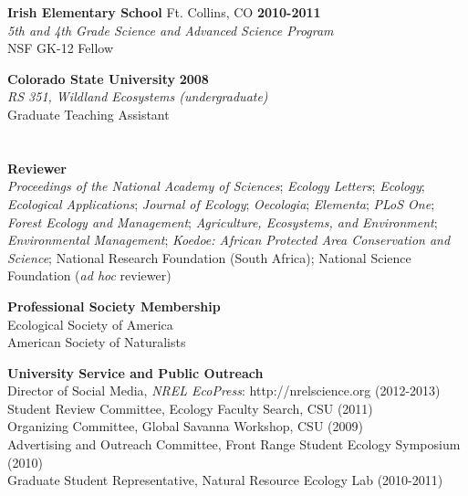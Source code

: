 \documentclass[margin,line]{resume}
\begin{document}
\begin{resume}
    \textbf{Irish Elementary School} Ft. Collins, CO \hfill \textbf{2010-2011}\\ 
   		\textsl{5th and 4th Grade Science and Advanced Science Program}\\
		NSF GK-12 Fellow
		
     \textbf{Colorado State University} \hfill \textbf{2008}\\ 
               \textsl{RS 351, Wildland Ecosystems (undergraduate)}\\
               Graduate Teaching Assistant 
     \section{\textmd{\textsf{\color{MidnightBlue}{Professional\\Service}}}}
    \textbf{Reviewer}\\
    	\textsl{Proceedings of the National Academy of Sciences};
	\textsl{Ecology Letters};
  \textsl{Ecology};
	\textsl{Ecological Applications};
	\textsl{Journal of Ecology};
	\textsl{Oecologia};
  \textsl{Elementa};
  \textsl{PLoS One};
	\textsl{Forest Ecology and Management};
	\textsl{Agriculture, Ecosystems, and Environment};
	\textsl{Environmental Management};
	 \textsl{Koedoe: African Protected Area Conservation and Science};
	National Research Foundation (South Africa);
	National Science Foundation (\emph{ad hoc} reviewer)
	

 \textbf{Professional Society Membership}\\
    	Ecological Society of America\\
	American Society of Naturalists


   \textbf{University Service and Public Outreach}\\
   	Director of Social Media, \textsl{NREL EcoPress}: http://nrelscience.org (2012-2013)\\
	Student Review Committee, Ecology Faculty Search, CSU (2011)\\
	Organizing Committee, Global Savanna Workshop, CSU (2009)\\
	Advertising and Outreach Committee, Front Range Student Ecology Symposium (2010)\\
	Graduate Student Representative, Natural Resource Ecology Lab (2010-2011)
  

\end{resume}
\end{document}
